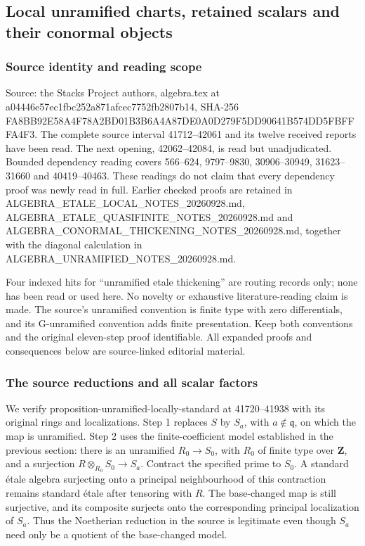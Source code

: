 \subsection{Local unramified charts, retained scalars and their conormal objects}\label{local-unramified-charts-retained-scalars-and-their-conormal-objects}

\subsubsection{Source identity and reading scope}\label{source-identity-and-reading-scope}

Source: the Stacks Project authors, algebra.tex at a04446e57ec1fbc252a871afcec7752fb2807b14, SHA-256 FA8BB92E58A4F78A2BD01B3B6A4A87DE0A0D279F5DD90641B574DD5FBFFFA4F3. The complete source interval 41712--42061 and its twelve received reports have been read. The next opening, 42062--42084, is read but unadjudicated. Bounded dependency reading covers 566--624, 9797--9830, 30906--30949, 31623--31660 and 40419--40463. These readings do not claim that every dependency proof was newly read in full. Earlier checked proofs are retained in ALGEBRA\_ETALE\_LOCAL\_NOTES\_20260928.md, ALGEBRA\_ETALE\_QUASIFINITE\_NOTES\_20260928.md and ALGEBRA\_CONORMAL\_THICKENING\_NOTES\_20260928.md, together with the diagonal calculation in ALGEBRA\_UNRAMIFIED\_NOTES\_20260928.md.

Four indexed hits for ``unramified etale thickening'' are routing records only; none has been read or used here. No novelty or exhaustive literature-reading claim is made. The source's unramified convention is finite type with zero differentials, and its G-unramified convention adds finite presentation. Keep both conventions and the original eleven-step proof identifiable. All expanded proofs and consequences below are source-linked editorial material.

\subsubsection{The source reductions and all scalar factors}\label{the-source-reductions-and-all-scalar-factors}

We verify proposition-unramified-locally-standard at 41720--41938 with its original rings and localizations. Step 1 replaces \(S\) by \(S_a\), with \(a\notin\mathfrak q\), on which the map is unramified. Step 2 uses the finite-coefficient model established in the previous section: there is an unramified \(R_0\to S_0\), with \(R_0\) of finite type over \(\mathbf Z\), and a surjection \(R\otimes_{R_0}S_0\to S_a\). Contract the specified prime to \(S_0\). A standard étale algebra surjecting onto a principal neighbourhood of this contraction remains standard étale after tensoring with \(R\). The base-changed map is still surjective, and its composite surjects onto the corresponding principal localization of \(S_a\). Thus the Noetherian reduction in the source is legitimate even though \(S_a\) need only be a quotient of the base-changed model.

